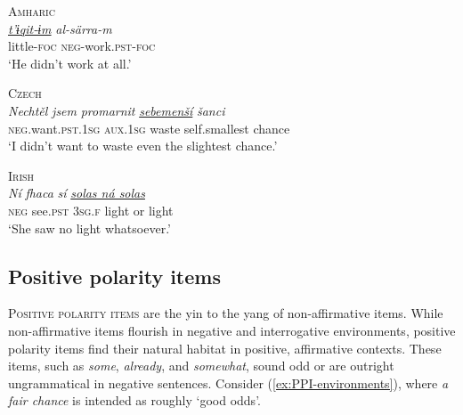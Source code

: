 \begin{tcolorbox}[title=Non-affirmative items in other languages, colback=white]
\ea \textsc{Amharic}\\
\gll \textit{\uline{t'ɨqit-ɨm}} \textit{al-särra-m}\\
     little-\textsc{foc} \textsc{neg}-work.\textsc{pst-foc}\\
\glt `He didn't work at all.'
\z

\ea \textsc{Czech}\\
\gll \textit{Nechtěl} \textit{jsem} \textit{promarnit} \textit{\uline{sebemenší}} \textit{šanci}\\
     \textsc{neg}.want.\textsc{pst.1sg} \textsc{aux.1sg} waste self.smallest chance\\
\glt `I didn't want to waste even the slightest chance.'
\z

\ea \textsc{Irish}\\
\gll \textit{Ní} \textit{fhaca} \textit{sí} \textit{\uline{solas ná solas}}\\
     \textsc{neg} see.\textsc{pst} \textsc{3sg.f} {light or light}\\
\glt `She saw no light whatsoever.'
\z

    
\end{tcolorbox}


\subsection{Positive polarity items}

\textsc{Positive polarity items} are the yin to the yang of non-affirmative items. While non-affirmative items flourish in negative and interrogative environments, positive polarity items find their natural habitat in positive, affirmative contexts. These items, such as \textit{some}, \textit{already}, and \textit{somewhat}, sound odd or are outright ungrammatical in negative sentences. Consider (\ref{ex:PPI-environments}), where \textit{a fair chance} is intended as roughly `good odds'.

\ea \label{ex:PPI-environments}
    \ea
        \z
    \ex
        \z
    \z
\z

